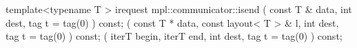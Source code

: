 template<typename T >
irequest mpl::communicator::isend
   ( const T & data, int dest, tag t = tag(0) ) const;
   ( const T * data, const layout< T > &  l, int  dest, tag  t = tag(0) ) const;
   ( iterT  begin, iterT  end, int  dest, tag  t = tag(0) ) const;
